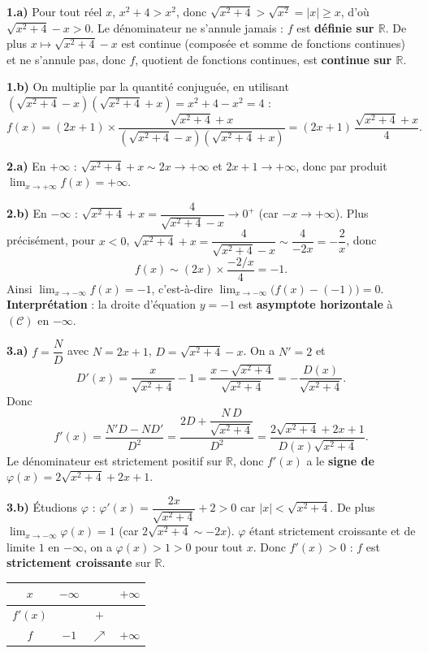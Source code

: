 \documentclass[11pt]{article}
\begin{document}
\begin{corrige}
\textbf{1.a)} Pour tout réel $x$, $x^2+4>x^2$, donc $\sqrt{x^2+4}>\sqrt{x^2}=|x|\geq x$, d'où $\sqrt{x^2+4}-x>0$. Le dénominateur ne s'annule jamais : $f$ est \textbf{définie sur $\mathbb{R}$}. De plus $x\mapsto\sqrt{x^2+4}-x$ est continue (composée et somme de fonctions continues) et ne s'annule pas, donc $f$, quotient de fonctions continues, est \textbf{continue sur $\mathbb{R}$}.

\textbf{1.b)} On multiplie par la quantité conjuguée, en utilisant $(\sqrt{x^2+4}-x)(\sqrt{x^2+4}+x)=x^2+4-x^2=4$ :
\[f(x)=(2x+1)\times\dfrac{\sqrt{x^2+4}+x}{(\sqrt{x^2+4}-x)(\sqrt{x^2+4}+x)}=(2x+1)\,\dfrac{\sqrt{x^2+4}+x}{4}.\]

\textbf{2.a)} En $+\infty$ : $\sqrt{x^2+4}+x\sim 2x\to+\infty$ et $2x+1\to+\infty$, donc par produit $\displaystyle\lim_{x\to+\infty}f(x)=+\infty$.

\textbf{2.b)} En $-\infty$ : $\sqrt{x^2+4}+x=\dfrac{4}{\sqrt{x^2+4}-x}\to 0^+$ (car $-x\to+\infty$). Plus précisément, pour $x<0$, $\sqrt{x^2+4}+x=\dfrac{4}{\sqrt{x^2+4}-x}\sim\dfrac{4}{-2x}=-\dfrac{2}{x}$, donc
\[f(x)\sim (2x)\times\dfrac{-2/x}{4}=-1.\]
Ainsi $\displaystyle\lim_{x\to-\infty}f(x)=-1$, c'est-à-dire $\displaystyle\lim_{x\to-\infty}\big(f(x)-(-1)\big)=0$.\\
\textbf{Interprétation} : la droite d'équation $y=-1$ est \textbf{asymptote horizontale} à $(\mathcal{C})$ en $-\infty$.

\textbf{3.a)} $f=\dfrac{N}{D}$ avec $N=2x+1$, $D=\sqrt{x^2+4}-x$. On a $N'=2$ et
\[D'(x)=\dfrac{x}{\sqrt{x^2+4}}-1=\dfrac{x-\sqrt{x^2+4}}{\sqrt{x^2+4}}=-\dfrac{D(x)}{\sqrt{x^2+4}}.\]
Donc
\[f'(x)=\dfrac{N'D-ND'}{D^2}=\dfrac{2D+\dfrac{N\,D}{\sqrt{x^2+4}}}{D^2}=\dfrac{2\sqrt{x^2+4}+2x+1}{D(x)\sqrt{x^2+4}}.\]
Le dénominateur est strictement positif sur $\mathbb{R}$, donc $f'(x)$ a le \textbf{signe de $\varphi(x)=2\sqrt{x^2+4}+2x+1$}.

\textbf{3.b)} Étudions $\varphi$ : $\varphi'(x)=\dfrac{2x}{\sqrt{x^2+4}}+2>0$ car $|x|<\sqrt{x^2+4}$. De plus $\displaystyle\lim_{x\to-\infty}\varphi(x)=1$ (car $2\sqrt{x^2+4}\sim -2x$). $\varphi$ étant strictement croissante et de limite $1$ en $-\infty$, on a $\varphi(x)>1>0$ pour tout $x$. Donc $f'(x)>0$ : $f$ est \textbf{strictement croissante} sur $\mathbb{R}$.
\begin{center}\begin{tabular}{|c|ccc|}\hline $x$ & $-\infty$ & & $+\infty$ \\ \hline $f'(x)$ & & $+$ & \\ \hline $f$ & $-1$ & $\nearrow$ & $+\infty$ \\ \hline\end{tabular}\end{center}


\end{corrige}
\end{document}
